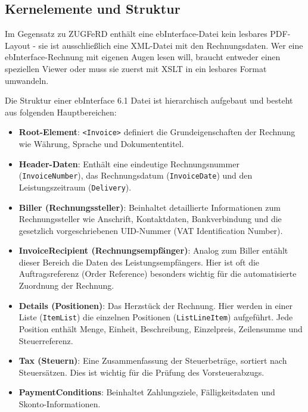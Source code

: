 \subsection{Kernelemente und Struktur}
Im Gegensatz zu ZUGFeRD enthält eine ebInterface-Datei kein lesbares PDF-Layout - sie ist ausschließlich eine XML-Datei mit den Rechnungsdaten. Wer eine ebInterface-Rechnung mit eigenen Augen lesen will, braucht entweder einen speziellen Viewer oder muss sie zuerst mit XSLT in ein lesbares Format umwandeln.

Die Struktur einer ebInterface 6.1 Datei ist hierarchisch aufgebaut und besteht aus folgenden Hauptbereichen:
\begin{itemize}
    \item \textbf{Root-Element}: \texttt{<Invoice>} definiert die Grundeigenschaften der Rechnung wie Währung, Sprache und Dokumententitel.
    \item \textbf{Header-Daten}: Enthält eine eindeutige Rechnungsnummer (\texttt{InvoiceNumber}), das Rechnungsdatum (\texttt{InvoiceDate}) und den Leistungszeitraum (\texttt{Delivery}).
    \item \textbf{Biller (Rechnungssteller)}: Beinhaltet detaillierte Informationen zum Rechnungssteller wie Anschrift, Kontaktdaten, Bankverbindung und die gesetzlich vorgeschriebenen UID-Nummer (VAT Identification Number).
    \item \textbf{InvoiceRecipient (Rechnungsempfänger)}: Analog zum Biller entählt dieser Bereich die Daten des Leistungsempfängers. Hier ist oft die Auftragsreferenz (Order Reference) besonders wichtig für die automatisierte Zuordnung der Rechnung.
    \item \textbf{Details (Positionen)}: Das Herzstück der Rechnung. Hier werden in einer Liste (\texttt{ItemList}) die einzelnen Positionen (\texttt{ListLineItem}) aufgeführt. Jede Position enthält Menge, Einheit, Beschreibung, Einzelpreis, Zeilensumme und Steuerreferenz.
    \item \textbf{Tax (Steuern)}: Eine Zusammenfassung der Steuerbeträge, sortiert nach Steuersätzen. Dies ist wichtig für die Prüfung des Vorsteuerabzugs.
    \item \textbf{PaymentConditions}: Beinhaltet Zahlungsziele, Fälligkeitsdaten und Skonto-Informationen.
\end{itemize}

